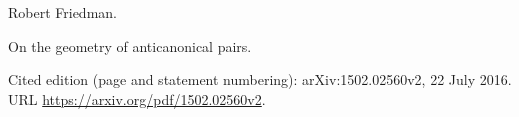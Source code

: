 Robert Friedman.

\newblock On the geometry of anticanonical pairs.

\newblock Cited edition (page and statement numbering): arXiv:1502.02560v2, 22 July 2016.
\newblock URL \url{https://arxiv.org/pdf/1502.02560v2}.


